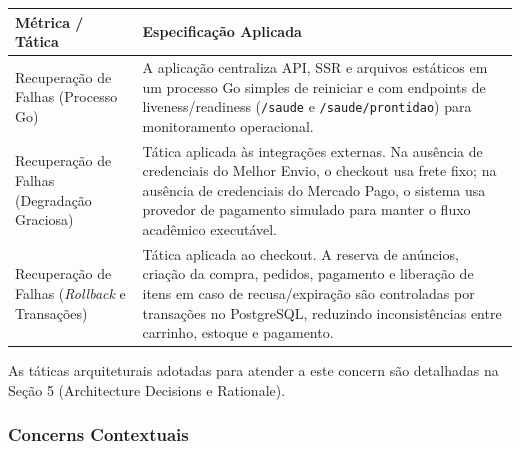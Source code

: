 \documentclass[12pt, a4paper]{article}
\begin{document}
\begin{longtable}{|p{4.5cm}|p{10cm}|}
\hline
\textbf{Métrica / Tática} & \textbf{Especificação Aplicada} \\
\hline
Recuperação de Falhas (Processo Go) & A aplicação centraliza API, SSR e arquivos estáticos em um processo Go simples de reiniciar e com endpoints de liveness/readiness (\texttt{/saude} e \texttt{/saude/prontidao}) para monitoramento operacional. \\
\hline
Recuperação de Falhas (Degradação Graciosa) & Tática aplicada às integrações externas. Na ausência de credenciais do Melhor Envio, o checkout usa frete fixo; na ausência de credenciais do Mercado Pago, o sistema usa provedor de pagamento simulado para manter o fluxo acadêmico executável. \\
\hline
Recuperação de Falhas (\textit{Rollback} e Transações) & Tática aplicada ao checkout. A reserva de anúncios, criação da compra, pedidos, pagamento e liberação de itens em caso de recusa/expiração são controladas por transações no PostgreSQL, reduzindo inconsistências entre carrinho, estoque e pagamento. \\
\hline
\end{longtable}

\noindent As táticas arquiteturais adotadas para atender a este concern são detalhadas na Seção 5 (Architecture Decisions e Rationale).

\subsubsection{Concerns Contextuais}
\end{document}

